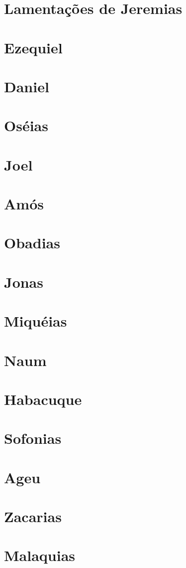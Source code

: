 \documentclass[a4paper,11pt,oneside]{book}
\theoremstyle{definition}
\theoremstyle{break}
\begin{document}
\chapter{Lamentações de Jeremias}
\chapter{Ezequiel}
\chapter{Daniel}
\chapter{Oséias}
\chapter{Joel}
\chapter{Amós}
\chapter{Obadias}
\chapter{Jonas}
\chapter{Miquéias}
\chapter{Naum}
\chapter{Habacuque}
\chapter{Sofonias}
\chapter{Ageu}
\chapter{Zacarias}
\chapter{Malaquias}
\end{document}
